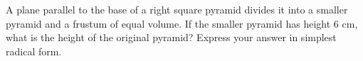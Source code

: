 A plane parallel to the base of a right square pyramid divides it into a smaller pyramid and a frustum of equal volume. If the smaller pyramid has height $6$ cm, what is the height of the original pyramid? Express your answer in simplest radical form.
